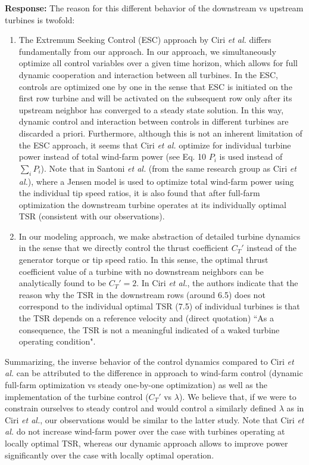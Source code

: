\documentclass[]{article}
\begin{document}
\textbf{Response:} The reason for this different behavior of the downstream vs upstream turbines is twofold:
\begin{enumerate}
	\item The Extremum Seeking Control (ESC) approach by Ciri \emph{et al.} differs fundamentally from our approach. In our approach, we simultaneously optimize all control variables over a given time horizon, which allows for full dynamic cooperation and interaction between all turbines. In the ESC, controls are optimized one by one in the sense that ESC is initiated on the first row turbine and will be activated on the subsequent row only after its upstream neighbor has converged to a steady state solution. In this way, dynamic control and interaction between controls in different turbines are discarded a priori. Furthermore, although this is not an inherent limitation of the ESC approach, it seems that Ciri \emph{et al.} optimize for individual turbine power instead of total wind-farm power (see Eq. 10 $P_i$ is used instead of $\sum_i P_i$). Note that in Santoni \emph{et al.} (from the same research group as Ciri \emph{et al.}), where a Jensen model is used to optimize total wind-farm power using the individual tip speed ratios, it is also found that after full-farm optimization the downstream turbine operates at its individually optimal TSR (consistent with our observations).
	
	\item In our modeling approach, we make abstraction of detailed turbine dynamics in the sense that we directly control the thrust coefficient $C_T'$ instead of the generator torque or tip speed ratio. In this sense, the optimal thrust coefficient value of a turbine with no downstream neighbors can be analytically found to be $C_T' = 2$. In Ciri \emph{et al.}, the authors indicate that the reason why the TSR in the downstream rows (around 6.5) does not correspond to the individual optimal TSR (7.5) of individual turbines is that the TSR depends on a reference velocity and (direct quotation) ``As a consequence, the TSR is not a meaningful indicated of a waked turbine operating condition". 
	
\end{enumerate}

Summarizing, the inverse behavior of the control dynamics compared to Ciri \emph{et al.} can be attributed to the difference in approach to wind-farm control (dynamic full-farm optimization vs steady one-by-one optimization) as well as the implementation of the turbine control ($C_T'$ vs $\lambda$). We believe that, if we were to constrain ourselves to steady control and would control a similarly defined $\lambda$ as in Ciri \emph{et al.}, our observations would be similar to the latter study. Note that Ciri \emph{et al.} do not increase wind-farm power over the case with turbines operating at locally optimal TSR, whereas our dynamic approach allows to improve power significantly over the case with locally optimal operation. 
\end{document}
